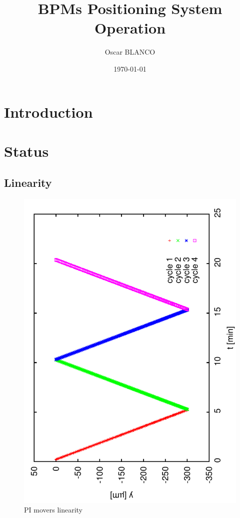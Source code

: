 \documentclass[a4paper,11pt]{book}
\title{BPMs Positioning System Operation}
\author{Oscar BLANCO}
\date{\today}
\begin{document}
\maketitle
\tableofcontents
\frontmatter
\chapter{Introduction}
\mainmatter
\chapter{Status}
\section{Linearity}
\begin{figure}
\centering
 \includegraphics[scale=0.5,angle=-90]{image01.pdf}\caption{PI movers linearity}\label{f-LinPI01}
\end{figure}
\end{document}
